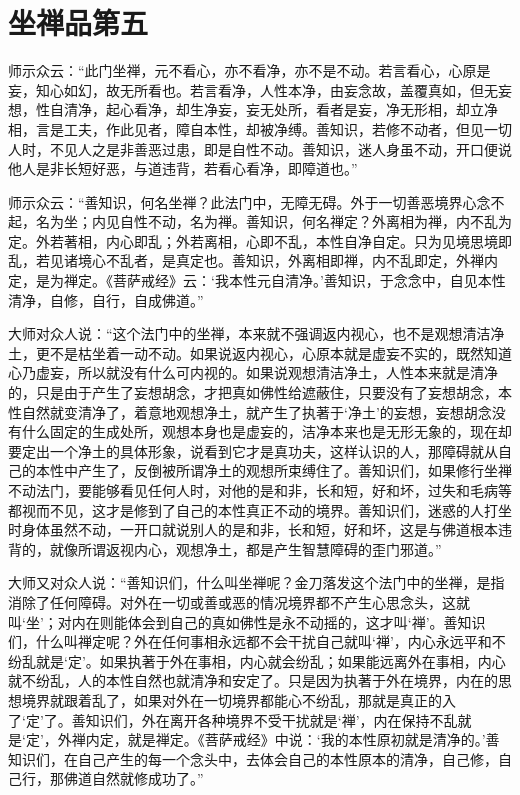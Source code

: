 \documentclass[12pt,twoside,openany]{book}
\newcommand{\kai}[1]{{\CJKfamily{kai}#1}}
\begin{document}
\chapter{坐禅品第五}
师示众云：“此门坐禅，元不看心，亦不看净，亦不是不动。若言看心，心原是妄，知心如幻，故无所看也。若言看净，人性本净，由妄念故，盖覆真如，但无妄想，性自清净，起心看净，却生净妄，妄无处所，看者是妄，净无形相，却立净相，言是工夫，作此见者，障自本性，却被净缚。善知识，若修不动者，但见一切人时，不见人之是非善恶过患，即是自性不动。善知识，迷人身虽不动，开口便说他人是非长短好恶，与道违背，若看心看净，即障道也。”

师示众云：“善知识，何名坐禅？此法门中，无障无碍。外于一切善恶境界心念不起，名为坐；内见自性不动，名为禅。善知识，何名禅定？外离相为禅，内不乱为定。外若著相，内心即乱；外若离相，心即不乱，本性自净自定。只为见境思境即乱，若见诸境心不乱者，是真定也。善知识，外离相即禅，内不乱即定，外禅内定，是为禅定。《菩萨戒经》云：‘我本性元自清净。’善知识，于念念中，自见本性清净，自修，自行，自成佛道。”

\kai{大师对众人说：“这个法门中的坐禅，本来就不强调返内视心，也不是观想清洁净土，更不是枯坐着一动不动。如果说返内视心，心原本就是虚妄不实的，既然知道心乃虚妄，所以就没有什么可内视的。如果说观想清洁净土，人性本来就是清净的，只是由于产生了妄想胡念，才把真如佛性给遮蔽住，只要没有了妄想胡念，本性自然就变清净了，着意地观想净土，就产生了执著于‘净土’的妄想，妄想胡念没有什么固定的生成处所，观想本身也是虚妄的，洁净本来也是无形无象的，现在却要定出一个净土的具体形象，说看到它才是真功夫，这样认识的人，那障碍就从自己的本性中产生了，反倒被所谓净土的观想所束缚住了。善知识们，如果修行坐禅不动法门，要能够看见任何人时，对他的是和非，长和短，好和坏，过失和毛病等都视而不见，这才是修到了自己的本性真正不动的境界。善知识们，迷惑的人打坐时身体虽然不动，一开口就说别人的是和非，长和短，好和坏，这是与佛道根本违背的，就像所谓返视内心，观想净土，都是产生智慧障碍的歪门邪道。”
	
大师又对众人说：“善知识们，什么叫坐禅呢？金刀落发这个法门中的坐禅，是指消除了任何障碍。对外在一切或善或恶的情况境界都不产生心思念头，这就叫‘坐’；对内在则能体会到自己的真如佛性是永不动摇的，这才叫‘禅’。善知识们，什么叫禅定呢？外在任何事相永远都不会干扰自己就叫‘禅’，内心永远平和不纷乱就是‘定’。如果执著于外在事相，内心就会纷乱；如果能远离外在事相，内心就不纷乱，人的本性自然也就清净和安定了。只是因为执著于外在境界，内在的思想境界就跟着乱了，如果对外在一切境界都能心不纷乱，那就是真正的入了‘定’了。善知识们，外在离开各种境界不受干扰就是‘禅’，内在保持不乱就是‘定’，外禅内定，就是禅定。《菩萨戒经》中说：‘我的本性原初就是清净的。’善知识们，在自己产生的每一个念头中，去体会自己的本性原本的清净，自己修，自己行，那佛道自然就修成功了。”}
\end{document}
